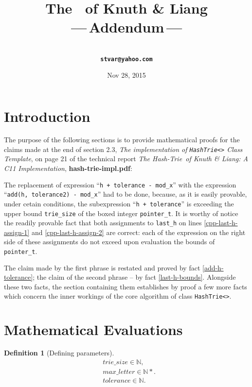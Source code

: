 \documentclass[a4paper,9pt,leqno]{article}
\title{The \Hashtrie\ of Knuth \& Liang\\---\,Addendum\,---}
\author{\larger\vargyas\medskip\\ \tt\textbf{stvar@yahoo.com}}
\date{Nov 28, 2015}
\renewcommand{\=}{\protect\nobreakdash-\hspace{0pt}}
\renewcommand{\~}{\protect\nobreakdash--\hspace{0pt}}
\newcommand{\plusplus}{\textbf{\raisebox{1pt}{++}}}
\newcommand{\Hashtrie}{Hash\=\!Trie}
\newcommand{\code}[1]{{\tt{#1}}}
\theoremstyle{plain}
\theoremstyle{definition}
\newtheorem{defn}[fact]{Definition}
\theoremstyle{remark}
\newcommand{\factref}[1]{fact \ref{#1}}
\newcommand\Nat{\mathbb{N}}
\newcommand\Nat*{\mathbb{N}^*}
\begin{document}
\maketitle
\tableofcontents

\section{Introduction}

The purpose of the following sections is to provide mathematical proofs for
the claims made at the end of section 2.3, \emph{The implementation of
\code{HashTrie<>} Class Template}, on page 21 of the technical report
\emph{The \Hashtrie\ of Knuth \& Liang: A C\plusplus11 Implementation},
\textbf{hash-trie-impl.pdf}:

\begin{quoting}
The replacement of expression ``\code{h + tolerance - mod\_x}''  with the
expression ``\code{add(h, tolerance2) - mod\_x}'' had to be done, because,
as it is easily provable, under cetain conditions, the subexpression
``\code{h + tolerance}'' is exceeding the upper bound \code{trie\_size}
of the boxed integer \code{pointer\_t}. It is worthy of notice the readily
provable fact that both assignments to \code{last\_h} on lines
\ref{cpp-last-h-assign-1} and \ref{cpp-last-h-assign-2} are correct:
each of the expression on the right side of these assignments do not
exceed upon evaluation the bounds of \code{pointer\_t}.
\end{quoting}

The claim made by the first phrase is restated and proved by
\factref{add-h-tolerance}; the claim of the second phrase -- by
\factref{last-h-bounds}.
Alongside these two facts, the section containing them establishes by proof
a few more facts which concern the inner workings of the core algorithm
of class \code{HashTrie<>}.

\section{Mathematical Evaluations}

\begin{defn}[Defining parameters]
\begin{align}
& trie\_size \in \Nat,   \label{trie-size}\\
%
& max\_letter \in \Nat*. \label{max-letter}\\
%
& tolerance \in \Nat.    \label{tolerance}
\end{align}
\end{defn}
\end{document}
